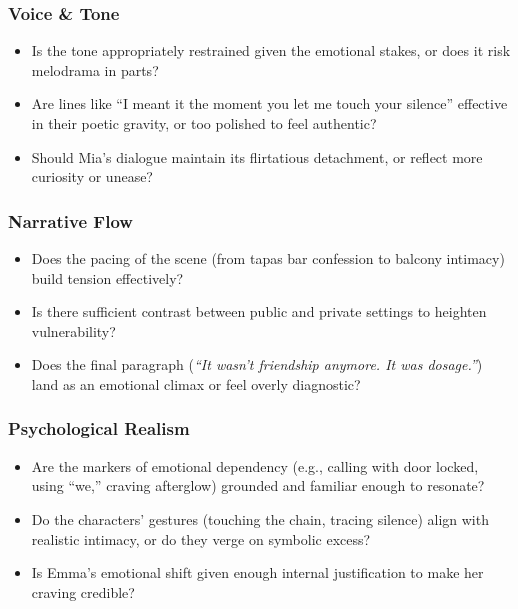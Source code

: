 \subsubsection*{Voice \& Tone}

\begin{itemize}
  \item Is the tone appropriately restrained given the emotional stakes, or does it risk melodrama in parts?
  \item Are lines like ``I meant it the moment you let me touch your silence'' effective in their poetic gravity, or too polished to feel authentic?
  \item Should Mia’s dialogue maintain its flirtatious detachment, or reflect more curiosity or unease?
\end{itemize}

\subsubsection*{Narrative Flow}

\begin{itemize}
  \item Does the pacing of the scene (from tapas bar confession to balcony intimacy) build tension effectively?
  \item Is there sufficient contrast between public and private settings to heighten vulnerability?
  \item Does the final paragraph (\textit{“It wasn’t friendship anymore. It was dosage.”}) land as an emotional climax or feel overly diagnostic?
\end{itemize}

\subsubsection*{Psychological Realism}

\begin{itemize}
  \item Are the markers of emotional dependency (e.g., calling with door locked, using “we,” craving afterglow) grounded and familiar enough to resonate?
  \item Do the characters’ gestures (touching the chain, tracing silence) align with realistic intimacy, or do they verge on symbolic excess?
  \item Is Emma’s emotional shift given enough internal justification to make her craving credible?
\end{itemize}


